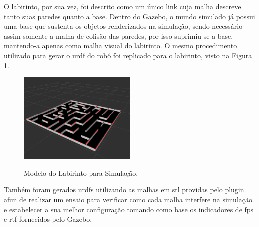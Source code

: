 O labirinto, por sua vez, foi descrito como um único link cuja malha descreve tanto suas paredes quanto a base. Dentro do Gazebo, o mundo simulado já possui uma base que sustenta os objetos renderizados na simulação, sendo necessário assim somente a malha de colisão das paredes, por isso suprimiu-se a base, mantendo-a apenas como malha visual do labirinto. O mesmo procedimento utilizado para gerar o \gls*{urdf} do robô foi replicado para o labirinto, visto na Figura \ref{fig:minus_maze_description}.

\begin{figure}[H]
	\centering
	\caption{Modelo do Labirinto para Simulação.}
	\includegraphics[width=0.5\textwidth]
	{Figures/minus_maze_description}
	\label{fig:minus_maze_description}
\end{figure}

Também foram gerados \glspl*{urdf} utilizando as malhas em \gls*{stl} providas pelo plugin afim de realizar um ensaio para verificar como cada malha interfere na simulação e estabelecer a sua melhor configuração tomando como base os indicadores de \gls*{fps} e \gls*{rtf} fornecidos pelo Gazebo.